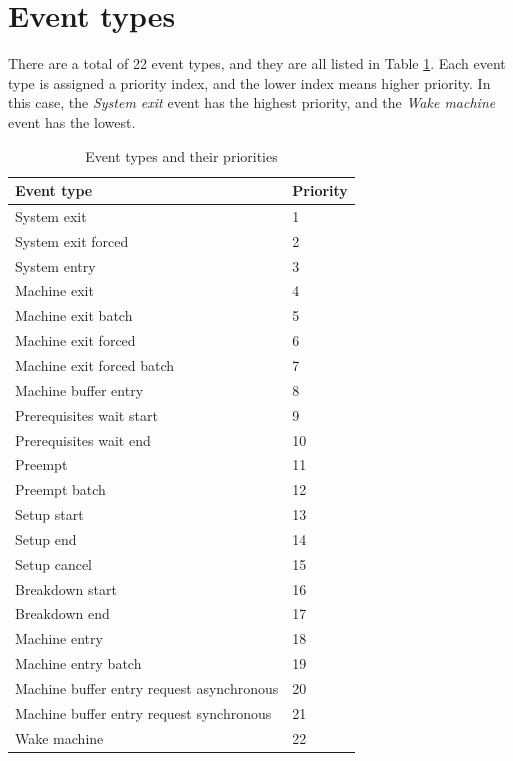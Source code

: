 \section{Event types}
\label{sec:event_types}

There are a total of 22 event types, and they are all listed in Table \ref{tab:event_types}. Each event type is assigned a priority index, and the lower index means higher priority. In this case, the \textit{System exit} event has the highest priority, and the \textit{Wake machine} event has the lowest.

\begin{table}[!htbp]
    \begin{center}
        \begin{tabular}{|l|l|} 
         \hline
         Event type & Priority \\ [0.5ex] 
         \hline\hline
         System exit & 1 \\ 
         \hline
         System exit forced & 2 \\
         \hline
         System entry & 3 \\
         \hline
         Machine exit & 4 \\
         \hline
         Machine exit batch & 5 \\
         \hline
         Machine exit forced & 6 \\
         \hline
         Machine exit forced batch & 7 \\
         \hline
         Machine buffer entry & 8 \\
         \hline
         Prerequisites wait start & 9 \\
         \hline
         Prerequisites wait end & 10 \\
         \hline
         Preempt & 11 \\
         \hline
         Preempt batch & 12 \\
         \hline
         Setup start & 13 \\
         \hline
         Setup end & 14 \\
         \hline
         Setup cancel & 15 \\
         \hline
         Breakdown start & 16 \\
         \hline
         Breakdown end & 17 \\
         \hline
         Machine entry & 18 \\
         \hline
         Machine entry batch & 19 \\
         \hline
         Machine buffer entry request asynchronous & 20 \\
         \hline
         Machine buffer entry request synchronous & 21 \\
         \hline
         Wake machine & 22 \\
         \hline
        \end{tabular}
        \end{center}
        \caption{Event types and their priorities}
    \label{tab:event_types}
    \end{table}

